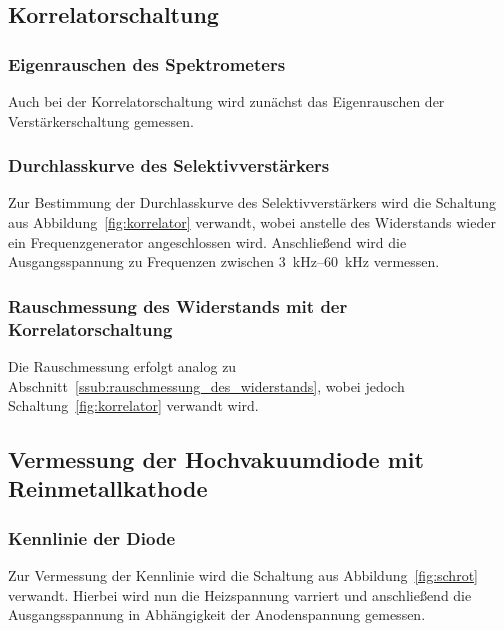 \subsection{Korrelatorschaltung}
\label{sub:korrelatorschaltung}

\subsubsection{Eigenrauschen des Spektrometers}
\label{ssub:eigenrauschen_des_spektrometers}

Auch bei der Korrelatorschaltung wird zunächst das Eigenrauschen der 
Verstärkerschaltung gemessen.

\subsubsection{Durchlasskurve des Selektivverstärkers}
\label{ssub:durchlasskurve_des_selektivverstärkers}

Zur Bestimmung der Durchlasskurve des Selektivverstärkers wird die Schaltung
aus Abbildung~\ref{fig:korrelator} verwandt, wobei anstelle des Widerstands
wieder ein Frequenzgenerator angeschlossen wird.
Anschließend wird die Ausgangsspannung zu Frequenzen zwischen
\SIrange{3}{60}{\kilo\hertz} vermessen.

\subsubsection{Rauschmessung des Widerstands mit der Korrelatorschaltung}
\label{ssub:rauschmessung_des_widerstands_mit_der_korrelatorschaltung}

Die Rauschmessung erfolgt analog zu
Abschnitt~\ref{ssub:rauschmessung_des_widerstands}, wobei jedoch
Schaltung~\ref{fig:korrelator} verwandt wird.

\subsection{Vermessung der Hochvakuumdiode mit Reinmetallkathode}
\label{sub:vermessung_der_hochvakuumdiode_mit_reinmetallkathode}

\subsubsection{Kennlinie der Diode}
\label{ssub:kennlinie_der_diode}

Zur Vermessung der Kennlinie wird die Schaltung aus Abbildung~\ref{fig:schrot}
verwandt. Hierbei wird nun die Heizspannung varriert und anschließend die
Ausgangsspannung in Abhängigkeit der Anodenspannung gemessen.

